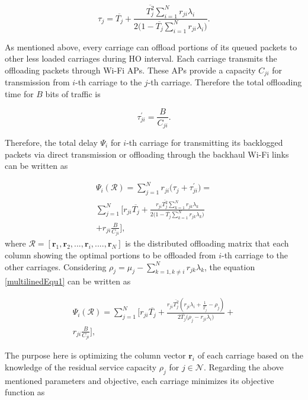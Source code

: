 \documentclass[journal]{IEEEtran}
\begin{document}
{\begin{equation}
\tau_j = \overline{T_j} + \frac{\overline{T_j^2}\sum_{i=1}^{N} r_{ji}\lambda_{i}}{2\big(1-\overline{T_j}\sum_{i=1}^{N} r_{ji}\lambda_{i}\big)}.
\label{equ2}
\end{equation}
\noindent

As mentioned above, every carriage can offload portions of its queued packets to other less loaded carriages during HO interval. Each carriage transmits the offloading packets through Wi-Fi APs. These APs provide a capacity $C_{ji}$ for transmission from $i$-th carriage to the $j$-th carriage. Therefore the total offloading time for $B$ bits of traffic is

\begin{equation}
\tau_{ji}^{'}= \frac{B}{C_{ji}}. 
\label{equ3}
\end{equation} 

Therefore, the total delay $\Psi_{i}$ for $i$-th carriage for transmitting its backlogged packets via direct transmission or offloading through the backhaul Wi-Fi links can be written as

\begin{multline}
\Psi_{i}(\mathcal{R}) = \sum_{j=1}^{N} r_{ji}\bigg(\tau_j + \tau_{ji}^{'} \bigg) = \\ \sum_{j=1}^{N}  \bigg[r_{ji}\overline{T_j} + \frac{r_{ji}\overline{T_j^2} \sum_{k=1}^{N} r_{jk}\lambda_{k}}{2\big(1-\overline{T_j}\sum_{k=1}^{N} r_{jk}\lambda_{k}\big)}\\ +r_{ji}\frac{B}{C_{ji}} \bigg],
\label{multilinedEqu1}
\end{multline}
\noindent
where $\mathcal{R}=[\textbf{r}_1,\textbf{r}_2,...,\textbf{r}_i,....,\textbf{r}_N]$ is the distributed offloading matrix that each column showing the optimal portions to be offloaded from $i$-th carriage to the other carriages. Considering $\rho_{j} = \mu_{j} - \sum_{k=1, k\neq i}^{N} r_{jk}\lambda_{k}$, the equation \ref{multilinedEqu1} can be written as

\begin{multline}
\Psi_{i}(\mathcal{R}) = \sum_{j=1}^{N} \bigg[r_{ji}\overline{T_j} + \frac{r_{ji}\overline{T_j^2} (r_{ji}\lambda_{i} + \frac{1}{\overline{T_j}} -\rho_{j})}{2\overline{T_j}\big(\rho_{j}-r_{ji}\lambda_i)} +\\ r_{ji}\frac{B}{C_{ji}} \bigg],
\label{multilinedEqu2}
\end{multline}  

The purpose here is optimizing the column vector $\textbf{r}_i$ of each carriage based on the knowledge of the residual service capacity $\rho_{j}$ for $j \in \mathcal{N}$. Regarding the above mentioned parameters and objective, each carriage minimizes its objective function as 

}
\end{document}
